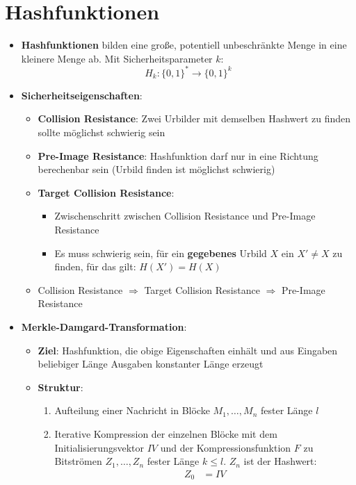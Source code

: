 \section{Hashfunktionen}%
\label{hash:sec:hashfunktionen}

\begin{itemize}
	\item \textbf{Hashfunktionen} bilden eine große, potentiell unbeschränkte Menge in eine kleinere Menge ab. Mit Sicherheitsparameter $k$:
	$$
		H_k: \{0, 1\}^* \rightarrow \{0, 1\}^k
	$$
	\item \textbf{Sicherheitseigenschaften}:
	\begin{itemize}
		\item \textbf{Collision Resistance}: Zwei Urbilder mit demselben Hashwert zu finden sollte möglichst schwierig sein
		\item \textbf{Pre-Image Resistance}: Hashfunktion darf nur in eine Richtung berechenbar sein (Urbild finden ist möglichst schwierig)
		\item \textbf{Target Collision Resistance}:
		\begin{itemize}
			\item Zwischenschritt zwischen Collision Resistance und Pre-Image Resistance
			\item Es muss schwierig sein, für ein \textbf{gegebenes} Urbild $X$ ein $X' \neq X$ zu finden, für das gilt: $H(X') = H(X)$
		\end{itemize}
		\item Collision Resistance $\Rightarrow$ Target Collision Resistance $\Rightarrow$ Pre-Image Resistance
	\end{itemize}
	\item \textbf{Merkle-Damgard-Transformation}:
	\begin{itemize}
		\item \textbf{Ziel}: Hashfunktion, die obige Eigenschaften einhält und aus Eingaben beliebiger Länge Ausgaben konstanter Länge erzeugt
		\item \textbf{Struktur}: 
		\begin{enumerate}
			\item Aufteilung einer Nachricht in Blöcke $M_1, \dots, M_n$ fester Länge $l$
			\item Iterative Kompression der einzelnen Blöcke mit dem Initialisierungsvektor $IV$ und der Kompressionsfunktion $F$ zu Bitströmen $Z_1, \dots, Z_n$ fester Länge $k \leq l$. $Z_n$ ist der Hashwert:
			\begin{align*}
				Z_0 &= IV\\

\end{align*}
\end{enumerate}
\end{itemize}
\end{itemize}
